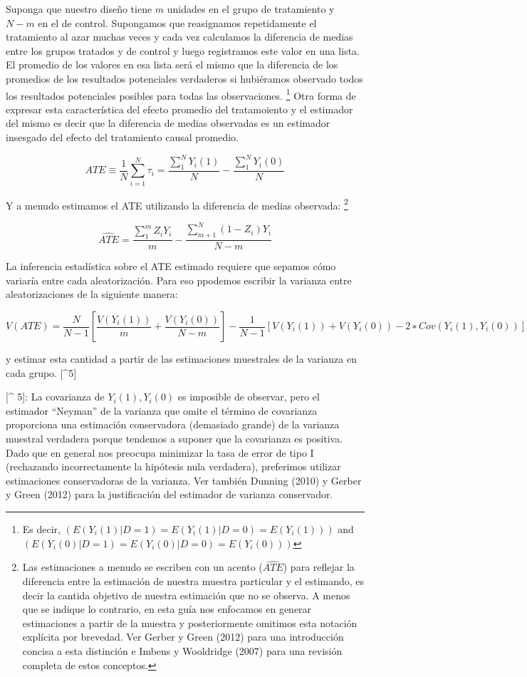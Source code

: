 \documentclass[
]{article}
\begin{document}
Suponga que nuestro diseño tiene \(m\) unidades en el grupo de
tratamiento y \(N − m\) en el de control. Supongamos que reasignamos
repetidamente el tratamiento al azar muchas veces y cada vez calculamos
la diferencia de medias entre los grupos tratados y de control y luego
registramos este valor en una lista. El promedio de los valores en esa
lista será el mismo que la diferencia de los promedios de los resultados
potenciales verdaderos si hubiéramos observado todos los resultados
potenciales posibles para todas las observaciones. \footnote{Es decir,
  \((E(Y_i(1)|D=1)=E(Y_i(1)|D=0)=E(Y_i(1)))\) and
  \((E(Y_i(0)|D=1)=E(Y_i(0)|D=0)=E(Y_i(0)))\)} Otra forma de expresar
esta característica del efecto promedio del tratamoiento y el estimador
del mismo es decir que la diferencia de medias observadas es un
estimador insesgado del efecto del tratamiento causal promedio.

\[ATE≡\frac{1}{N}∑^{N}_{i=1}τ_{i}=\frac{∑^{N}_{1}Y_{i}(1)}{N}−\frac{∑^{N}_{1}Y_{i}(0)}{N}\]

Y a menudo estimamos el ATE utilizando la diferencia de medias
observada: \footnote{Las estimaciones a menudo se escriben con un acento
  (\(\widehat {ATE}\)) para reflejar la diferencia entre la estimación
  de nuestra muestra particular y el estimando, es decir la cantida
  objetivo de nuestra estimación que no se observa. A menos que se
  indique lo contrario, en esta guía nos enfocamos en generar
  estimaciones a partir de la muestra y posteriormente omitimos esta
  notación explícita por brevedad. Ver Gerber y Green (2012) para una
  introducción concisa a esta distinción e Imbens y Wooldridge (2007)
  para una revisión completa de estos conceptos.}

\[\widehat{ATE} =\frac{∑^m_1Z_{i}Y_{i}}{m}−\frac{∑^{N}_{m+1}(1−Z_{i})Y_{i}}{N−m}\]

La inferencia estadística sobre el ATE estimado requiere que sepamos
cómo variaría entre cada aleatorización. Para eso ppodemos escribir la
varianza entre aleatorizaciones de la siguiente manera:

\[V(ATE) = \frac{N}{N−1} [\frac{V(Y_{i}(1))}{m}+\frac{V(Y_{i}(0))}{N−m}]−\frac{1}{N−1}[V(Y_{i}(1))+V(Y_{i}(0))−2∗Cov(Y_{i}(1),Y_{i}(0))]\]

y estimar esta cantidad a partir de las estimaciones muestrales de la
varianza en cada grupo. {[}\^{}5{]}

{[}\^{} 5{]}: La covarianza de \(Y_{i} (1), Y_ {i} (0)\) es imposible de
observar, pero el estimador ``Neyman'' de la varianza que omite el
término de covarianza proporciona una estimación conservadora (demasiado
grande) de la varianza muestral verdadera porque tendemos a suponer que
la covarianza es positiva. Dado que en general nos preocupa minimizar la
tasa de error de tipo I (rechazando incorrectamente la hipótesis nula
verdadera), preferimos utilizar estimaciones conservadoras de la
varianza. Ver también Dunning (2010) y Gerber y Green (2012) para la
justificación del estimador de varianza conservador.
\end{document}
